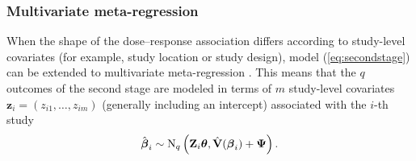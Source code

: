 \subsubsection{Multivariate meta-regression}

When the shape of the dose--response association differs according to study-level covariates (for example, study location or study design), model (\ref{eq:secondstage}) can be extended to multivariate meta-regression \citep{vanhouwelingen_advanced_2002, gasparrini_multivariate_2012}. This means that the $q$ outcomes of the second stage are modeled in terms of $m$ study-level covariates $\mathbf{z}_i=(z_{i1},\ldots,z_{im})$ (generally including an intercept) associated with the $i$-th study
\begin{equation}
\hat{\boldsymbol{\beta}}_i \sim \operatorname{N}_q \left( \mathbf{Z}_i \boldsymbol{\theta}, \hat{\mathbf{V}}(\boldsymbol{\beta}_i) + \boldsymbol{\Psi} \right).
\label{eq:secondstagemetareg}
\end{equation}

